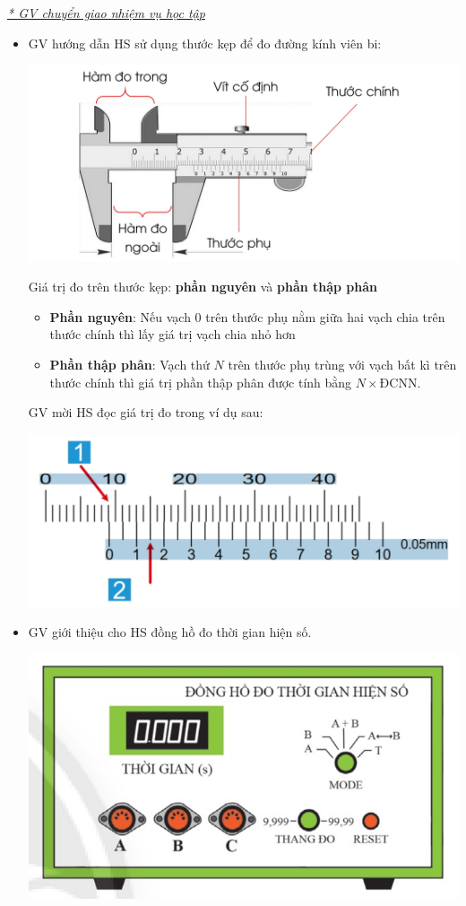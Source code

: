 {\textit{\underline{* GV chuyển giao nhiệm vụ học tập}}\\
	\begin{itemize}[label=-]
		\item 	GV hướng dẫn HS sử dụng thước kẹp để đo đường kính viên bi:
		\begin{center}
			\includegraphics[scale=0.35]{figs/G10-BAI6-2}
		\end{center}
		Giá trị đo trên thước kẹp: \textbf{phần nguyên} và \textbf{phần thập phân}
		\begin{itemize}[label=$\bullet$]
			\item \textbf{Phần nguyên}: Nếu vạch 0 trên thước phụ nằm giữa hai vạch chia trên thước chính thì lấy giá trị vạch chia nhỏ hơn
			\item \textbf{Phần thập phân}: Vạch thứ $N$ trên thước phụ trùng với vạch bất kì trên thước chính thì giá trị phần thập phân được tính bằng $N\times \text{ĐCNN}$.
		\end{itemize}
		GV mời HS đọc giá trị đo trong ví dụ sau:
		\begin{center}
			\includegraphics[scale=0.4]{figs/G10-BAI6-3}
		\end{center}
		\item 	GV giới thiệu cho HS đồng hồ đo thời gian hiện số.
		\begin{center}
			\includegraphics[scale=0.4]{figs/G10-BAI6-4}

\end{center}
\end{itemize}}
